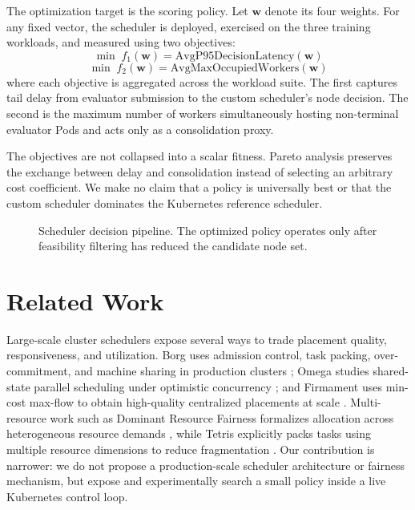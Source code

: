 \documentclass[conference]{IEEEtran}
\begin{document}
The optimization target is the scoring policy. Let $\mathbf{w}$ denote its four weights. For any fixed vector, the scheduler is deployed, exercised on the three training workloads, and measured using two objectives:
\begin{equation}
\min \; f_1(\mathbf{w}) = \mathrm{AvgP95DecisionLatency}(\mathbf{w})
\end{equation}
\begin{equation}
\min \; f_2(\mathbf{w}) = \mathrm{AvgMaxOccupiedWorkers}(\mathbf{w})
\end{equation}
where each objective is aggregated across the workload suite. The first captures tail delay from evaluator submission to the custom scheduler's node decision. The second is the maximum number of workers simultaneously hosting non-terminal evaluator Pods and acts only as a consolidation proxy.

The objectives are not collapsed into a scalar fitness. Pareto analysis preserves the exchange between delay and consolidation instead of selecting an arbitrary cost coefficient. We make no claim that a policy is universally best or that the custom scheduler dominates the Kubernetes reference scheduler.

\begin{figure}[t]
\centering

\caption{Scheduler decision pipeline. The optimized policy operates only after feasibility filtering has reduced the candidate node set.}
\label{fig:scheduler-flow}
\end{figure}

\section{Related Work}
Large-scale cluster schedulers expose several ways to trade placement quality, responsiveness, and utilization. Borg uses admission control, task packing, over-commitment, and machine sharing in production clusters \cite{ref-borg}; Omega studies shared-state parallel scheduling under optimistic concurrency \cite{ref-omega}; and Firmament uses min-cost max-flow to obtain high-quality centralized placements at scale \cite{ref-firmament}. Multi-resource work such as Dominant Resource Fairness formalizes allocation across heterogeneous resource demands \cite{ref-drf}, while Tetris explicitly packs tasks using multiple resource dimensions to reduce fragmentation \cite{ref-tetris}. Our contribution is narrower: we do not propose a production-scale scheduler architecture or fairness mechanism, but expose and experimentally search a small policy inside a live Kubernetes control loop.
\end{document}
